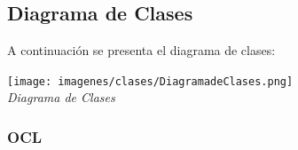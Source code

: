 \documentclass[spanish, 10pt,a4paper]{article}
\numberwithin{equation}{section} %
\begin{document}
\newpage
\subsection{Diagrama de Clases}
	A continuación se presenta el diagrama de clases:

\vspace{\baselineskip}
    \begin{center}
                \texttt{[image: imagenes/clases/DiagramadeClases.png]}
                \\
                \vspace{1pt}
                \footnotesize\textit{Diagrama de Clases}
        \end{center}
\vspace{\baselineskip}

\subsubsection{OCL}
\end{document}

